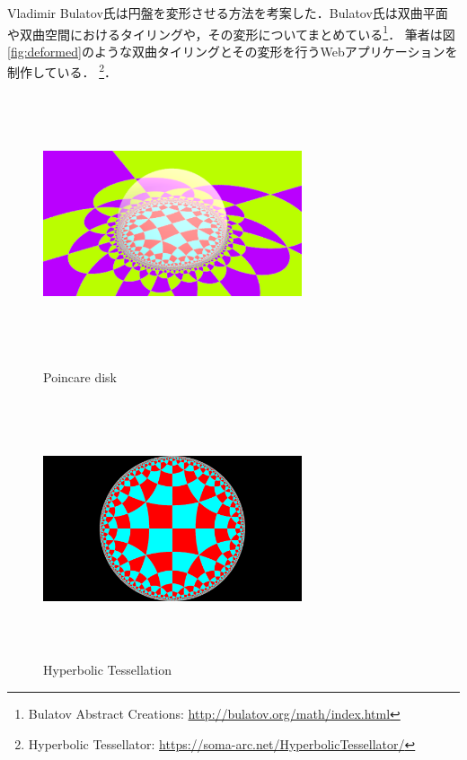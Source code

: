 Vladimir Bulatov氏は円盤を変形させる方法を考案した\cite{bending}．Bulatov氏は双曲平面や双曲空間におけるタイリングや，その変形についてまとめている\footnote{Bulatov Abstract Creations: \url{http://bulatov.org/math/index.html}}．
筆者は図\ref{fig:deformed}のような双曲タイリングとその変形を行うWebアプリケーションを制作している．
\footnote{Hyperbolic Tessellator: \url{https://soma-arc.net/HyperbolicTessellator/}}．


\begin{figure}[h!tbp]
 \begin{minipage}{0.49\hsize}
  \center
  \includegraphics[width=3in, height=3in, keepaspectratio]{../img/tessellation/poincare.pdf}
  \caption{Poincare disk}
  \label{fig:poincare}
 \end{minipage}
 \hspace*{\fill}
 \begin{minipage}{0.49\hsize}
  \center
  \includegraphics[width=3in, height=3in,
  keepaspectratio]{../img/tessellation/hyperbolicTessellation.pdf}
  \caption{Hyperbolic Tessellation}
  \label{fig:outer}
 \end{minipage}
\end{figure}


